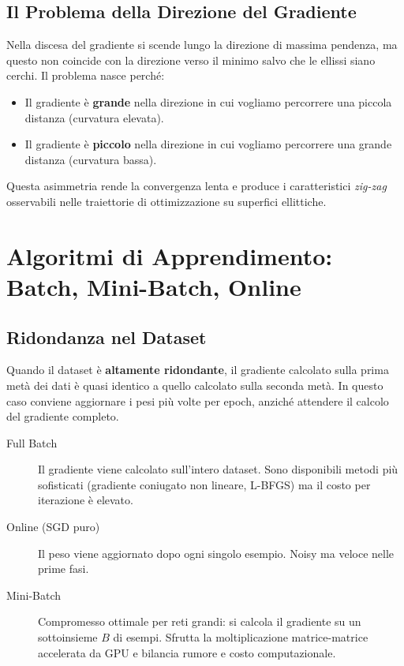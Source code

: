 \subsection{Il Problema della Direzione del Gradiente}
\label{subsec:gradient-direction}

Nella discesa del gradiente si scende lungo la direzione di massima pendenza,
ma questo non coincide con la direzione verso il minimo salvo che le ellissi
siano cerchi. Il problema nasce perché:

\begin{itemize}
  \item Il gradiente è \textbf{grande} nella direzione in cui vogliamo percorrere
        una piccola distanza (curvatura elevata).
  \item Il gradiente è \textbf{piccolo} nella direzione in cui vogliamo percorrere
        una grande distanza (curvatura bassa).
\end{itemize}

Questa asimmetria rende la convergenza lenta e produce i caratteristici
\emph{zig-zag} osservabili nelle traiettorie di ottimizzazione su superfici
ellittiche.

\section{Algoritmi di Apprendimento: Batch, Mini-Batch, Online}
\label{sec:learning-algorithms}

\subsection{Ridondanza nel Dataset}
\label{subsec:redundancy}

Quando il dataset è \textbf{altamente ridondante}, il gradiente calcolato sulla
prima metà dei dati è quasi identico a quello calcolato sulla seconda metà. In
questo caso conviene aggiornare i pesi più volte per epoch, anziché attendere il
calcolo del gradiente completo.

\begin{description}
  \item[Full Batch] Il gradiente viene calcolato sull'intero dataset. Sono
        disponibili metodi più sofisticati (gradiente coniugato non lineare,
        L-BFGS) ma il costo per iterazione è elevato.
  \item[Online (SGD puro)] Il peso viene aggiornato dopo ogni singolo esempio.
        Noisy ma veloce nelle prime fasi.
  \item[Mini-Batch] Compromesso ottimale per reti grandi: si calcola il gradiente
        su un sottoinsieme $B$ di esempi. Sfrutta la moltiplicazione
        matrice-matrice accelerata da GPU e bilancia rumore e costo computazionale.
\end{description}


